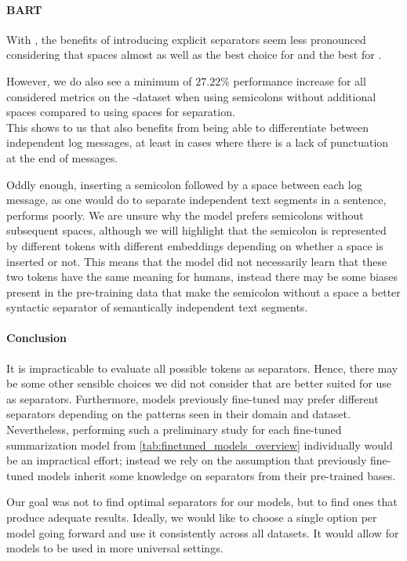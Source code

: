 \paragraph{BART}

With , the benefits of introducing explicit separators seem less pronounced
considering that spaces almost as well as the best choice for \logsummary{} and the best for \telco{}.

However, we do also see a minimum of \(27.22\%\) performance increase for all considered metrics on the \hadoop{}-dataset
when using semicolons without additional spaces compared to using spaces for separation.\\
This shows to us that  also benefits from being able to differentiate between independent log messages,
at least in cases where there is a lack of punctuation at the end of messages.

Oddly enough, inserting a semicolon followed by a space between each log message,
as one would do to separate independent text segments in a sentence, performs poorly.
We are unsure why the model prefers semicolons without subsequent spaces,
although we will highlight that the semicolon is represented by different tokens with different embeddings
depending on whether a space is inserted or not.
This means that the model did not necessarily learn that these two tokens have the same meaning for humans,
instead there may be some biases present in the pre-training data that make the semicolon without a space
a better syntactic separator of semantically independent text segments.

\paragraph{Conclusion}

It is impracticable to evaluate all possible tokens as separators.
Hence, there may be some other sensible choices
we did not consider that are better suited for use as separators.
Furthermore, models previously fine-tuned may prefer different separators depending on the patterns seen in their domain and dataset.
Nevertheless, performing such a preliminary study for each fine-tuned summarization model from \autoref{tab:finetuned_models_overview}
individually would be an impractical effort;
instead we rely on the assumption that previously fine-tuned models inherit some knowledge on separators from their pre-trained bases.

Our goal was not to find optimal separators for our models,
but to find ones that produce adequate results.
Ideally, we would like to choose a single option per model going forward and use it consistently across all datasets.
It would allow for models to be used in more universal settings.

